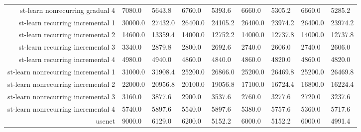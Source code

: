 \begin{tabular}{|r|l|l|l|l|l|l|l|l|}
  st-learn nonrecurring gradual 4 & 7080.0 & 5643.8 & 6760.0 & 5393.6 & 6660.0 & 5305.2 & 6660.0 & 5285.2 \\ 
  st-learn recurring incremental 1 & 30000.0 & 27432.0 & 26400.0 & 24105.2 & 26400.0 & 23974.2 & 26400.0 & 23974.2 \\ 
  st-learn recurring incremental 2 & 14600.0 & 13359.4 & 14000.0 & 12752.2 & 14000.0 & 12737.8 & 14000.0 & 12737.8 \\ 
  st-learn recurring incremental 3 & 3340.0 & 2879.8 & 2800.0 & 2692.6 & 2740.0 & 2606.0 & 2740.0 & 2606.0 \\ 
  st-learn recurring incremental 4 & 4980.0 & 4940.0 & 4860.0 & 4840.0 & 4860.0 & 4820.0 & 4860.0 & 4820.0 \\ 
  st-learn nonrecurring incremental 1 & 31000.0 & 31908.4 & 25200.0 & 26866.0 & 25200.0 & 26469.8 & 25200.0 & 26469.8 \\ 
  st-learn nonrecurring incremental 2 & 22000.0 & 20956.8 & 20100.0 & 19056.8 & 17100.0 & 16724.4 & 16800.0 & 16224.4 \\ 
  st-learn nonrecurring incremental 3 & 3160.0 & 3877.6 & 2900.0 & 3537.6 & 2760.0 & 3277.6 & 2720.0 & 3237.6 \\ 
  st-learn nonrecurring incremental 4 & 5740.0 & 5897.6 & 5540.0 & 5897.6 & 5380.0 & 5757.6 & 5360.0 & 5717.6 \\ 
  usenet & 9000.0 & 6129.0 & 6200.0 & 5152.2 & 6000.0 & 5152.2 & 6000.0 & 4991.4 \\ 
\end{tabular}
